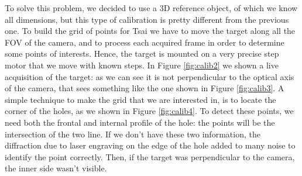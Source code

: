 To solve this problem, we decided to use a 3D reference object, of which we know all dimensions, but this type of calibration is pretty different from the previous one. To build the grid of points for Tsai we have to move the target along all the \acs{FOV} of the camera, and to process each acquired frame in order to determine some points of interests. Hence, the target is mounted on a very precise step motor that we move with known steps. In Figure \ref{fig:calib2} we shown a live acquisition of the target: as we can see it is not perpendicular to the optical axis of the camera, that sees something like the one shown in Figure \ref{fig:calib3}. A simple technique to make the grid that we are interested in, is to locate the corner of the holes, as we shown in Figure \ref{fig:calib4}. To detect these points, we need both the frontal and internal profile of the hole: the points will be the intersection of the two line. If we don't have these two information, the diffraction due to laser engraving on the edge of the hole added to many noise to identify the point correctly. Then, if the target was perpendicular to the camera, the inner side wasn't visible. \\
